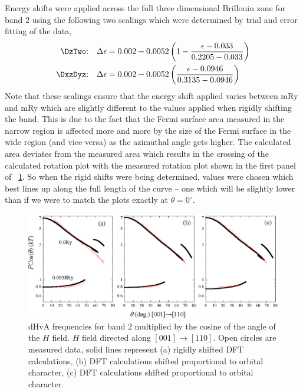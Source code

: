 Energy shifts were applied across the full three dimensional Brillouin zone for band $2$ using the following two scalings which were determined by trial and error fitting of the data,
\begin{align*}
\textrm{\DzTwo:}\quad \Delta\epsilon &= 0.002 - 0.0052 \left(1 - \frac{\epsilon - 0.033}{0.2205 - 0.033}\right) \\
\textrm{\DxzDyz:}\quad \Delta\epsilon &= 0.002 - 0.0052 \left(\frac{\epsilon - 0.0946}{0.3135 - 0.0946}\right)
\end{align*}
Note that these scalings ensure that the energy shift applied varies between \unit[-32]{mRy} and \unit[2]{mRy} which are slightly different to the values applied when rigidly shifting the band. This is due to the fact that the Fermi surface area measured in the narrow region is affected more and more by the size of the Fermi surface in the wide region (and vice-versa) as the azimuthal angle gets higher. The calculated area deviates from the measured area which results in the crossing of the calculated rotation plot with the measured rotation plot shown in the first panel of \fig~\ref{Fig:ResD:Band2DCharacterRigidComparison}. So when the rigid shifts were being determined, values were chosen which best lines up along the full length of the curve -- one which will be slightly lower than if we were to match the plots exactly at $\theta=0^\circ$.

\begin{figure}[htbp]
    \begin{center}
        \includegraphics[scale=0.8]{Chapter-dHvABaFe2P2/Figures/AngleDepMeasurements/BandCharacterRotPlot/Band2_110_RotPlot_Comparison}
        \caption{dHvA frequencies for band 2 multiplied by the cosine of the angle of the $H$ field. $H$ field directed along $[001]\rightarrow[110]$. Open circles are measured data, solid lines represent (a) rigidly shifted DFT calculations, (b) DFT calculations shifted proportional to \DzTwo orbital character, (c) DFT calculations shifted proportional to \DxzDyz orbital character.}
        \label{Fig:ResD:Band2DCharacterRigidComparison}
    \end{center}
\end{figure}

